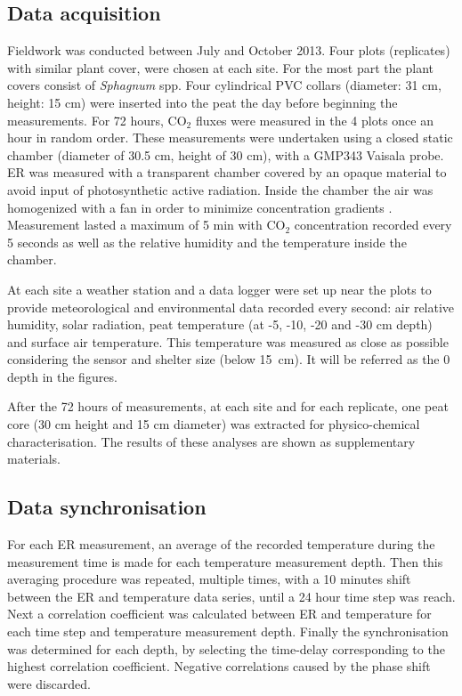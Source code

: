 \subsection{Data acquisition}
Fieldwork was conducted between July and October 2013. 
Four plots (replicates) with similar plant cover, were chosen at each site.
For the most part the plant covers consist of \textit{Sphagnum} spp.
Four cylindrical PVC collars (diameter: 31 cm, height: 15 cm) were inserted into the peat the day before beginning the measurements.
For 72 hours, CO$_{2}$ fluxes were measured in the 4 plots once an hour in random order.
These measurements were undertaken using a closed static chamber (diameter of 30.5 cm, height of 30 cm), with a GMP343 Vaisala probe.
ER was measured with a transparent chamber covered by an opaque material to avoid input of photosynthetic active radiation.
Inside the chamber the air was homogenized with a fan in order to minimize concentration gradients \citep{pumpanen2004}.
Measurement lasted a maximum of 5 min with CO$_{2}$ concentration recorded every 5 seconds as well as the relative humidity and the temperature inside the chamber.

At each site a weather station and a data logger were set up near the plots to provide meteorological and environmental data recorded every second: air relative humidity, solar radiation, peat temperature (at -5, -10, -20 and -30 cm depth) and surface air temperature.
This temperature was measured as close as possible considering the sensor and shelter size (below 15~cm). It will be referred as the 0 depth in the figures.

After the 72 hours of measurements, at each site and for each replicate, one peat core (30 cm height and 15 cm diameter) was extracted for physico-chemical characterisation.
The results of these analyses are shown as supplementary materials.

\subsection{Data synchronisation}

For each ER measurement, an average of the recorded temperature during the measurement time is made for each temperature measurement depth.
Then this averaging procedure was repeated, multiple times, with a 10 minutes shift between the ER and temperature data series, until a 24 hour time step was reach.
Next a correlation coefficient was calculated between ER and temperature for each time step and temperature measurement depth.
Finally the synchronisation was determined for each depth, by selecting the time-delay corresponding to the highest correlation coefficient.
Negative correlations caused by the phase shift were discarded.

